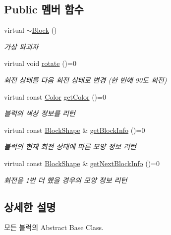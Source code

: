 \subsection*{Public 멤버 함수}
\begin{DoxyCompactItemize}
\item 
virtual \mbox{\hyperlink{class_block_a9f0026f5d2dafca3c101e70e4b34780f}{$\sim$\+Block}} ()
\begin{DoxyCompactList}\small\item\em 가상 파괴자 \end{DoxyCompactList}\item 
virtual void \mbox{\hyperlink{class_block_af1499ad7e48fb750581b471d0d5bb0e0}{rotate}} ()=0
\begin{DoxyCompactList}\small\item\em 회전 상태를 다음 회전 상태로 변경 (한 번에 90도 회전) \end{DoxyCompactList}\item 
virtual const \mbox{\hyperlink{class_block_ad054b4ac51df79aa910040b2a2fdf7b5}{Color}} \mbox{\hyperlink{class_block_af10efef648f21dc708e42e149cd6fbcf}{get\+Color}} ()=0
\begin{DoxyCompactList}\small\item\em 블럭의 색상 정보를 리턴 \end{DoxyCompactList}\item 
virtual const \mbox{\hyperlink{class_block_aca5d951639f113e2ebd7856209d6b9ab}{Block\+Shape}} \& \mbox{\hyperlink{class_block_a2cdc0af223d621add42ac6c37fede329}{get\+Block\+Info}} ()=0
\begin{DoxyCompactList}\small\item\em 블럭의 현재 회전 상태에 따른 모양 정보 리턴 \end{DoxyCompactList}\item 
virtual const \mbox{\hyperlink{class_block_aca5d951639f113e2ebd7856209d6b9ab}{Block\+Shape}} \& \mbox{\hyperlink{class_block_a654da164e0493be9de6f2f2334bc73e8}{get\+Next\+Block\+Info}} ()=0
\begin{DoxyCompactList}\small\item\em 회전을 1번 더 했을 경우의 모양 정보 리턴 \end{DoxyCompactList}\end{DoxyCompactItemize}


\subsection{상세한 설명}
모든 블럭의 Abstract Base Class. 

